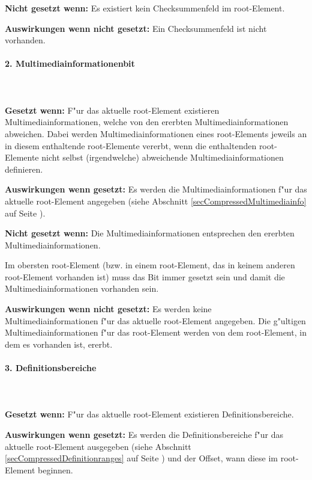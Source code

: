 \bigskip\noindent
\textbf{Nicht gesetzt wenn:} Es existiert kein Checksummenfeld im root-Element.

\bigskip\noindent
\textbf{Auswirkungen wenn nicht gesetzt:}
Ein Checksummenfeld ist nicht vorhanden.


\paragraph{2. Multimediainformationenbit}

\ \\\\\noindent
\textbf{Gesetzt wenn:} F"ur das aktuelle root-Element existieren Multimediainformationen, welche von den ererbten Multimediainformationen abweichen. Dabei werden Multimediainformationen eines root-Elements jeweils an in diesem enthaltende root-Elemente vererbt, wenn die enthaltenden root-Elemente nicht selbst (irgendwelche) abweichende Multimediainformationen definieren.

\bigskip\noindent
\textbf{Auswirkungen wenn gesetzt:}
Es werden die Multimediainformationen f"ur das aktuelle root-Element angegeben (siehe Abschnitt \ref{secCompressedMultimediainfo} auf Seite \pageref{secCompressedMultimediainfo}).

\bigskip\noindent
\textbf{Nicht gesetzt wenn:} Die Multimediainformationen entsprechen den ererbten Multimediainformationen.

Im obersten root-Element (bzw. in einem root-Element, das in keinem anderen root-Element vorhanden ist) muss das Bit immer gesetzt sein und damit die Multimediainformationen vorhanden sein.

\bigskip\noindent
\textbf{Auswirkungen wenn nicht gesetzt:}
Es werden keine Multimediainformationen f"ur das aktuelle root-Element angegeben. Die g"ultigen Multimediainformationen f"ur das root-Element werden von dem root-Element, in dem es vorhanden ist, ererbt.


\paragraph{3. Definitionsbereiche}

\ \\\\\noindent
\textbf{Gesetzt wenn:} F"ur das aktuelle root-Element existieren Definitionsbereiche.

\bigskip\noindent
\textbf{Auswirkungen wenn gesetzt:}
Es werden die Definitionsbereiche f"ur das aktuelle root-Element ausgegeben (siehe Abschnitt \ref{secCompressedDefinitionranges} auf Seite \pageref{secCompressedDefinitionranges}) und der Offset, wann diese im root-Element beginnen.

